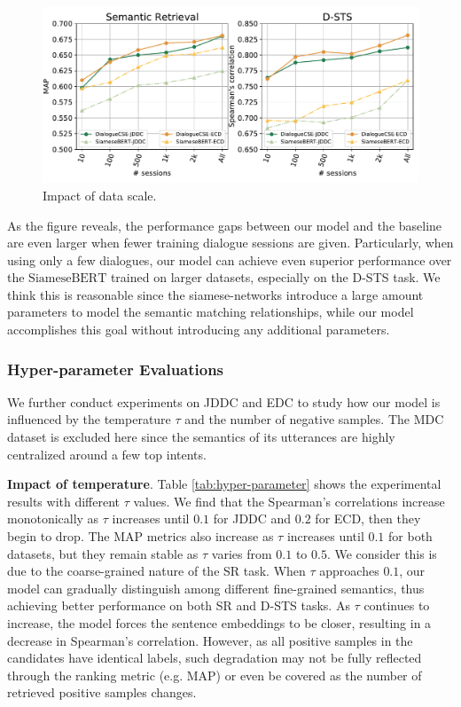 \documentclass[11pt]{article}
\begin{document}
\begin{figure}[htb]
  \centering
  \includegraphics[width=\linewidth]{figures/impact_of_datascale.pdf}
  \caption{Impact of data scale.} %
  \label{figure:session}
\end{figure}

As the figure reveals, the performance gaps between our model and the baseline are even larger when fewer training dialogue sessions are given.
Particularly, when using only a few dialogues, our model can achieve even superior performance over the $\text{SiameseBERT}$ trained on larger datasets, especially on the D-STS task.
We think this is reasonable since the siamese-networks introduce a large amount parameters to model the semantic matching relationships, while our model accomplishes this goal without introducing any additional parameters.

\subsubsection{Hyper-parameter Evaluations}
We further conduct experiments on JDDC and EDC to study how our model is influenced by the temperature $\tau$ and the number of negative samples.
The MDC dataset is excluded here since the semantics of its utterances are highly centralized around a few top intents.

{\textbf{Impact of temperature}}.
Table \ref{tab:hyper-parameter} shows the experimental results with different $\tau$ values.
We find that the Spearman's correlations increase monotonically as $\tau$ increases until $0.1$ for JDDC and $0.2$ for ECD, then they begin to drop.
The MAP metrics also increase as $\tau$ increases until $0.1$ for both datasets, but they remain stable as $\tau$ varies from $0.1$ to $0.5$.
We consider this is due to the coarse-grained nature of the SR task.
When $\tau$ approaches $0.1$, our model can gradually distinguish among different fine-grained semantics, thus achieving better performance on both SR and D-STS tasks.
As $\tau$ continues to increase, the model forces the sentence embeddings to be closer, resulting in a decrease in Spearman's correlation.
However, as all positive samples in the candidates have identical labels, such degradation may not be fully reflected through the ranking metric (e.g. MAP) or even be covered as the number of retrieved positive samples changes.
\end{document}

